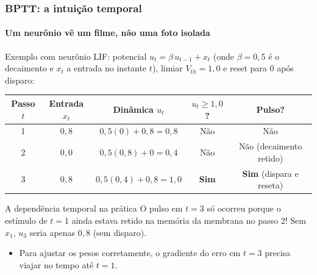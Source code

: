 \begin{frame}
	\frametitle{BPTT: a intuição temporal}
	\framesubtitle{Um neurônio vê um filme, não uma foto isolada}
	\small
	\par Exemplo com neurônio LIF: potencial $u_t = \beta\,u_{t-1} + x_t$ (onde $\beta=0{,}5$ é o decaimento e $x_t$ a entrada no instante $t$), limiar $V_{th}=1{,}0$ e reset para $0$ após disparo:
	\begin{center}
		\footnotesize
		\begin{tabular}{ccccc}
			\toprule
			\textbf{Passo $t$} & \textbf{Entrada $x_t$} & \textbf{Dinâmica $u_t$} & \textbf{$u_t \ge 1{,}0$?} & \textbf{Pulso?} \\
			\midrule
			1 & $0{,}8$ & $0{,}5(0) + 0{,}8 = 0{,}8$ & Não & Não \\
			2 & $0{,}0$ & $0{,}5(0{,}8) + 0 = 0{,}4$ & Não & Não (decaimento retido) \\
			3 & $0{,}8$ & $0{,}5(0{,}4) + 0{,}8 = 1{,}0$ & \textbf{Sim} & \textbf{Sim} (dispara e reseta) \\
			\bottomrule
		\end{tabular}
	\end{center}
	\begin{block}{A dependência temporal na prática}
		O pulso em $t=3$ só ocorreu porque o estímulo de $t=1$ ainda estava retido na memória da membrana no passo 2! Sem $x_1$, $u_3$ seria apenas $0{,}8$ (sem disparo).
	\end{block}
	\begin{itemize}
		\item Para ajustar os pesos corretamente, o gradiente do erro em $t=3$ precisa viajar no tempo até $t=1$.
	\end{itemize}
\end{frame}

